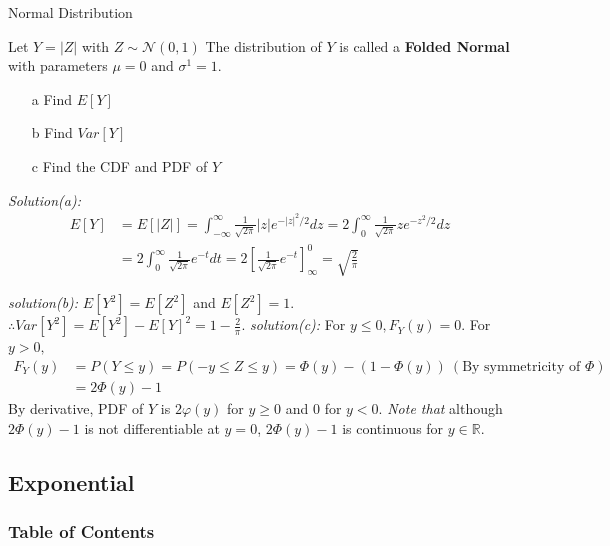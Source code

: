 \documentclass[8pt]{beamer}
\begin{document}
\begin{frame}{Normal Distribution}
    \begin{example}
        Let $Y = \vert Z \vert$ with $Z \sim \mathcal{N}(0,1)$ The distribution of $Y$ is called a \textbf{Folded Normal} with parameters $\mu=0$ and $\sigma^1=1$.

        \begin{enumerate}
            \item[a] Find $E[Y]$
            \item[b] Find $Var[Y]$
            \item[c] Find the CDF and PDF of $Y$ 
        \end{enumerate}

        \textit{Solution(a):} \[
        \begin{aligned}
            E[Y] &= E[\vert Z \vert] = \int_{-\infty}^\infty \frac{1}{\sqrt{2\pi}} \vert z \vert e^{- {\vert z\vert}^2/2} dz = 2 \int_0^\infty \frac{1}{\sqrt{2\pi}}z e^{-z^2 /2}dz \\ &= 2\int_0^\infty \frac{1}{\sqrt{2\pi}} e^{-t} dt
            = 2\left[ \frac{1}{\sqrt{2\pi}} e^{-t} \right]_\infty^0 = \sqrt{\frac{2}{\pi}}
        \end{aligned}
        \]

        \textit{solution(b):} $E[Y^2] = E[Z^2]$ and $E[Z^2] = 1$.
        $\therefore Var[Y^2] = E[Y^2] - E[Y]^2 = 1 - \frac{2}{\pi}$.
        \textit{solution(c):} For $y \leq 0, F_Y(y) = 0$. For $y >0,$
        \[\begin{aligned}
            F_Y(y) &= P(Y \leq y) = P(-y \leq Z  \leq y) = \Phi(y) - (1 - \Phi(y))\ (\text{By symmetricity of } \Phi) \\
            &= 2\Phi(y) -1\
        \end{aligned}
        \]
        By derivative, PDF of $Y$ is $2\varphi(y)$ for $y\geq 0$ and $0$ for $y < 0$. \textit{Note that} although $2\Phi(y) -1$ is not differentiable at $y=0$, $2\Phi(y) -1$ is continuous for $y \in \mathbb{R}$.
    \end{example}
\end{frame}


\subsection{Exponential}

\begin{frame}
    \frametitle{Table of Contents}
    \tableofcontents[currentsection]
\end{frame}
\end{document}
